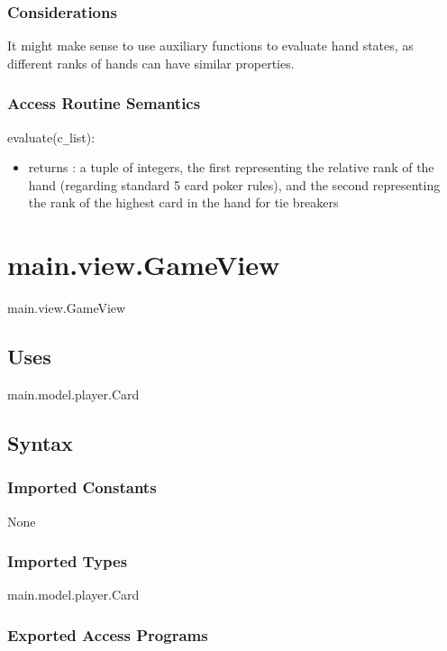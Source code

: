 \documentclass[12pt, titlepage]{article}
\begin{document}
\subsubsection* {Considerations}

It might make sense to use auxiliary functions to evaluate hand states, as different ranks of hands can have similar properties.

\subsubsection* {Access Routine Semantics}

\noindent evaluate(c\verb|_|list):
\begin{itemize}
\item returns : a tuple of integers, the first representing the relative rank of the hand (regarding standard 5 card poker rules), and the second representing the rank of the highest card in the hand for tie breakers 
\end{itemize}


\section* {main.view.GameView}

main.view.GameView

\subsection* {Uses}

main.model.player.Card

\subsection* {Syntax}

\subsubsection* {Imported Constants}

None

\subsubsection* {Imported Types}

main.model.player.Card

\subsubsection* {Exported Access Programs}
\end{document}
